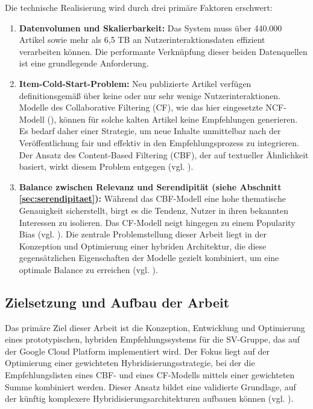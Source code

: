 Die technische Realisierung wird durch drei primäre Faktoren erschwert:

\begin{enumerate}
    \item \textbf{Datenvolumen und Skalierbarkeit:} Das System muss über 440.000 Artikel sowie mehr als 6,5 TB 
    an Nutzerinteraktionsdaten effizient verarbeiten können. Die performante Verknüpfung dieser beiden Datenquellen 
    ist eine grundlegende Anforderung.
    
    \item \textbf{Item-Cold-Start-Problem:} Neu publizierte Artikel verfügen definitionsgemäß über keine 
    oder nur sehr wenige Nutzerinteraktionen. Modelle des Collaborative Filtering (CF), wie das hier eingesetzte \ac{NCF}-Modell (\cite{he_neural_2017}), 
    können für solche kalten Artikel keine Empfehlungen generieren. Es bedarf daher einer Strategie, 
    um neue Inhalte unmittelbar nach der Veröffentlichung fair und effektiv in den Empfehlungsprozess zu integrieren. 
    Der Ansatz des Content-Based Filtering (CBF), der auf textueller Ähnlichkeit basiert, wirkt diesem Problem entgegen (vgl. \cite{Lops_CBRS_SOTA_2011}).
    
    \item \textbf{Balance zwischen Relevanz und Serendipität (siehe Abschnitt \ref{sec:serendipitaet}):} Während das CBF-Modell eine hohe thematische Genauigkeit 
    sicherstellt, birgt es die Tendenz, Nutzer in ihren bekannten Interessen zu isolieren. 
    Das CF-Modell neigt hingegen zu einem Popularity Bias (vgl. \cite{Abdollahpouri_Popularity_Bias_2019}). Die zentrale Problemstellung dieser Arbeit liegt in der 
    Konzeption und Optimierung einer hybriden Architektur, die diese gegensätzlichen Eigenschaften der Modelle gezielt 
    kombiniert, um eine optimale Balance zu erreichen (vgl. \cite{Kotkov_Serendipity_2016}).
\end{enumerate}

\subsection{Zielsetzung und Aufbau der Arbeit}
\label{sec:zielsetzung}
Das primäre Ziel dieser Arbeit ist die Konzeption, Entwicklung und Optimierung eines prototypischen, 
hybriden Empfehlungssystems für die \ac{SV-Gruppe}, das auf der Google Cloud Platform implementiert wird. 
Der Fokus liegt auf der Optimierung einer gewichteten Hybridisierungsstrategie, bei der die Empfehlungslisten 
eines \ac{CBF}- und eines \ac{CF}-Modells mittels einer gewichteten Summe 
kombiniert werden. Dieser Ansatz bildet eine validierte Grundlage, auf der künftig komplexere 
Hybridisierungsarchitekturen aufbauen können (vgl. \cite{burke_hybrid_2002}).

